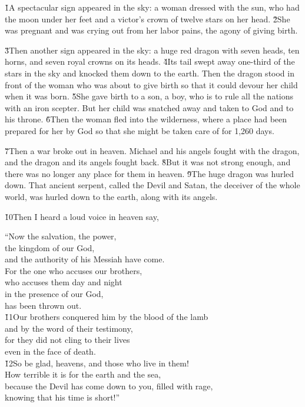 \v{1}A spectacular sign appeared in the sky: a woman dressed with the sun, who had the moon under her feet and a victor's crown of twelve stars on her head. \v{2}She was pregnant and was crying out from her labor pains, the agony of giving birth.

\v{3}Then another sign appeared in the sky: a huge red dragon with seven heads, ten horns, and seven royal crowns on its heads. \v{4}Its tail swept away one-third of the stars in the sky and knocked them down to the earth. Then the dragon stood in front of the woman who was about to give birth so that it could devour her child when it was born. \v{5}She gave birth to a son, a boy, who is to rule all the nations with an iron scepter. But her child was snatched away and taken to God and to his throne. \v{6}Then the woman fled into the wilderness, where a place had been prepared for her by God so that she might be taken care of for 1,260 days.

\v{7}Then a war broke out in heaven. Michael and his angels fought with the dragon, and the dragon and its angels fought back. \v{8}But it was not strong enough, and there was no longer any place for them in heaven. \v{9}The huge dragon was hurled down. That ancient serpent, called the Devil and Satan, the deceiver of the whole world, was hurled down to the earth, along with its angels.

\v{10}Then I heard a loud voice in heaven say,

\begin{poetry}
\poeml ``Now the salvation, the power, \\
\poemll    the kingdom of our God, \\
\poemlll       and the authority of his Messiah have come. \\
\poeml For the one who accuses our brothers, \\
\poemll    who accuses them day and night \\
\poeml in the presence of our God, \\
\poemll    has been thrown out. \\
\poeml \v{11}Our brothers conquered him by the blood of the lamb \\
\poemll    and by the word of their testimony, \\
\poeml for they did not cling to their lives \\
\poemll    even in the face of death. \\
\poeml \v{12}So be glad, heavens, and those who live in them! \\
\poeml How terrible it is for the earth and the sea, \\
\poemll    because the Devil has come down to you, filled with rage, \\
\poemlll       knowing that his time is short!''
\end{poetry}

